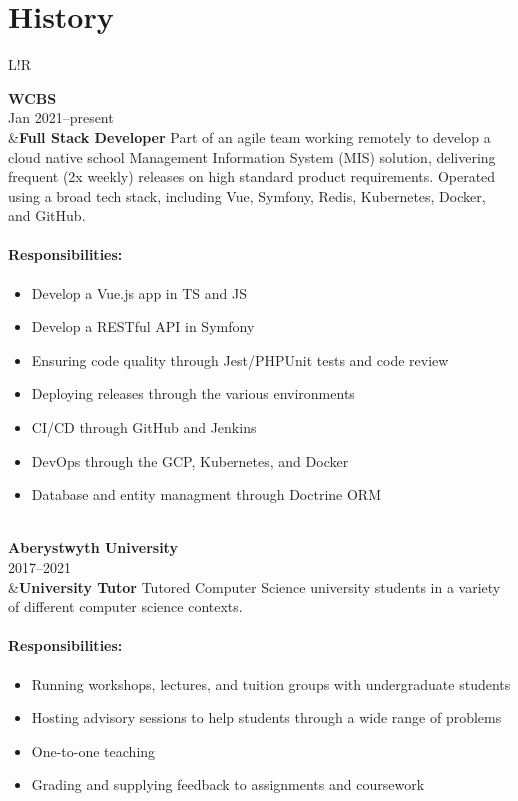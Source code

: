 \documentclass[10pt]{article}
\newcommand\VRule{\color{lightgray}\vrule width 0.5pt}
\begin{document}
\section*{History}
\begin{longtable}{L!{\VRule}R}

{\bf WCBS}\\
Jan 2021--present\\
&{\bf Full Stack Developer}\newline
Part of an agile team working remotely to develop a cloud native school Management Information System (MIS) solution, delivering frequent (2x weekly) releases on high standard product requirements. Operated using a broad tech stack, including Vue, Symfony, Redis, Kubernetes, Docker, and GitHub.

\vspace{-3mm}
\paragraph{Responsibilities:}
\begin{itemize}[noitemsep,topsep=0pt]
	\item Develop a Vue.js app in TS and JS
	\item Develop a RESTful API in Symfony
	\item Ensuring code quality through Jest/PHPUnit tests and code review
	\item Deploying releases through the various environments
	\item CI/CD through GitHub and Jenkins
	\item DevOps through the GCP, Kubernetes, and Docker
	\item Database and entity managment through Doctrine ORM
\end{itemize}
\\

{\bf Aberystwyth University}\\
2017--2021\\
&{\bf University Tutor}\newline
Tutored Computer Science university students in a variety of different computer science contexts.

\vspace{-3mm}
\paragraph{Responsibilities:}
\begin{itemize}[noitemsep,topsep=0pt]
	\item Running workshops, lectures, and tuition groups with undergraduate students
	\item Hosting advisory sessions to help students through a wide range of problems
	\item One-to-one teaching
	\item Grading and supplying feedback to assignments and coursework
\end{itemize}
\\


\end{longtable}
\end{document}
